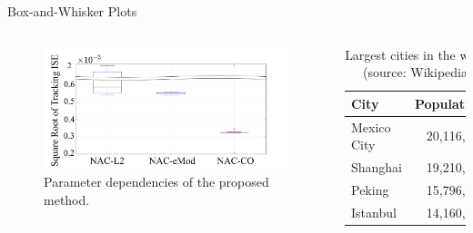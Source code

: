\documentclass[8pt, aspectratio=169]{beamer}
\begin{document}
\begin{frame}{Box-and-Whisker Plots}
  
  \begin{columns}
      \begin{figure}
        \includegraphics[width=\textwidth]{figures/BoxWhisker.drawio.png}
        \caption{Parameter dependencies of the proposed method.}
      \end{figure}

      \begin{table}
        \caption{Largest cities in the world (source: Wikipedia)}
        \begin{tabular}{@{} lr @{}}
          \toprule
          City & Population\\
          \midrule
          Mexico City & 20,116,842\\
          Shanghai & 19,210,000\\
          Peking & 15,796,450\\
          Istanbul & 14,160,467\\
          \bottomrule
        \end{tabular}
    \end{table}
    
  \end{columns}

\end{frame}
\end{document}
